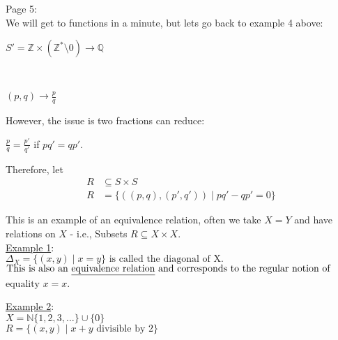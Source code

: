 \documentclass{article}
\begin{document}
\newpage
\begin{flushleft}
    Page 5: \\
    \vspace{1em}
 We will get to functions in a minute, but lets go back to example 4 above: 
 \vspace{0.5em}
\centerline{$S' = \mathbb{Z} \times (\mathbb{Z}^* \setminus {0}) \rightarrow \mathbb{Q}$} \\
\vspace{0.5em}
\centerline{$(p,q) \rightarrow \frac{p}{q}$}
\vspace{1em} 
However, the issue is two fractions can reduce: \\
\vspace{0.5em}
\centerline{ $\frac{p}{q} = \frac{p'}{q'}$ if $pq' = qp'$.} 
\vspace{1em} 
Therefore, let \begin{align*}
    R &\subseteq S \times S \\
    R &= \{ ((p,q),(p',q')) \mid pq'- qp' = 0 \}
    \end{align*}


    
 This is an example of an equivalence relation, often we take $X = Y$ and have relations on $X$ - i.e., Subsets  $R \subseteq X \times X$.
\vspace{1em} \\
\underline{Example 1}: \\
\vspace{0.5em}
$\Delta_X = \{(x,y) \mid x = y\} \text{ is called the diagonal of X.} $\\
\vspace{0.5em}
$\text{This is also an \underline{equivalence relation} and corresponds to the regular notion of}$ \\
$\text{equality } x = x$.


 \vspace{1em} 
   \underline{Example 2}: \\
    \vspace{0.5em}
     $X = \mathbb{N} \{1,2,3,\ldots\} \cup \{0\}$ \\
     $R = \{(x,y) \mid x+y \text{ divisible by } 2\}$   \\            

\end{flushleft}
\end{document}
